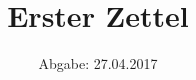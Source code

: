 

\subject{Physik IV SS17}
\title{Erster Zettel}
\date{
  Abgabe: 27.04.2017
}



\maketitle
\thispagestyle{empty}

\newpage





\printbibliography


